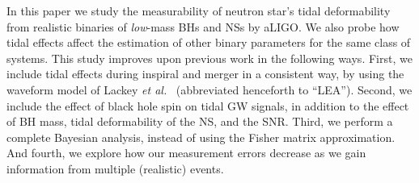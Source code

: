 \documentclass[aps,prd,amsmath,floats,floatfix, twocolumn,
superscriptaddress,nofootinbib,showpacs]{revtex4-1}
\newcommand{\lambdans}{\Lambda_\mathrm{NS}}
\begin{document}


In this paper we study the measurability of neutron star's tidal deformability
from realistic binaries of {\it low}-mass BHs and NSs by aLIGO. We also probe
how tidal effects affect the estimation of other binary parameters for the same
class of systems. This study improves upon previous work in the following ways.
% 
First, we include tidal effects during inspiral and merger in a consistent
way, by using the waveform model of Lackey {\it et al.}~\cite{Lackey:2013axa}
(abbreviated henceforth to ``LEA'').
% 
Second, we include the effect of black hole spin on tidal GW signals, in
addition to the effect of BH mass, tidal deformability of the NS, and the SNR.
% 
Third, we perform a complete Bayesian analysis, instead of using the Fisher matrix
approximation.
% 
And fourth, we explore how our measurement errors decrease as we gain information
from multiple (realistic) events.
% 
\end{document}
